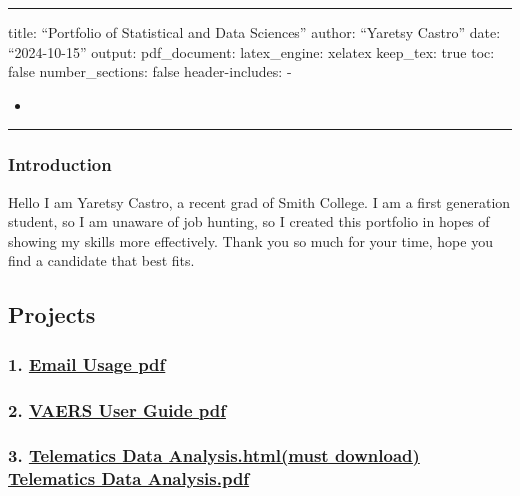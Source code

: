 \documentclass[
]{article}
\author{}
\date{\vspace{-2.5em}}
\begin{document}
\begin{center}\rule{0.5\linewidth}{0.5pt}\end{center}

title: ``Portfolio of Statistical and Data Sciences'' author: ``Yaretsy
Castro'' date: ``2024-10-15'' output: pdf\_document: latex\_engine:
xelatex keep\_tex: true toc: false number\_sections: false
header-includes: -

\usepackage{xcolor}

\begin{itemize}
\item
  \usepackage[colorlinks=true, urlcolor=blue, linkcolor=blue]{hyperref}
\end{itemize}

\begin{center}\rule{0.5\linewidth}{0.5pt}\end{center}

\subsubsection{Introduction}\label{introduction}

Hello I am Yaretsy Castro, a recent grad of Smith College. I am a first
generation student, so I am unaware of job hunting, so I created this
portfolio in hopes of showing my skills more effectively. Thank you so
much for your time, hope you find a candidate that best fits.

\subsection{Projects}\label{projects}

\subsubsection{\texorpdfstring{1.
\href{Projects/Mini-Project-1.pdf}{Email Usage
pdf}}{1. Email Usage pdf}}\label{email-usage-pdf}

\subsubsection{\texorpdfstring{2.
\href{Projects/final-project.pdf}{VAERS User Guide
pdf}}{2. VAERS User Guide pdf}}\label{vaers-user-guide-pdf}

\subsubsection{\texorpdfstring{3.
\href{Projects/term_paper.html}{Telematics Data Analysis.html(must
download)} \textbar{}
\href{Projects/Telematics\%20Data\%20101.pdf}{Telematics Data
Analysis.pdf}}{3. Telematics Data Analysis.html(must download) \textbar{} Telematics Data Analysis.pdf}}\label{telematics-data-analysis.htmlmust-download-telematics-data-analysis.pdf}
\end{document}
